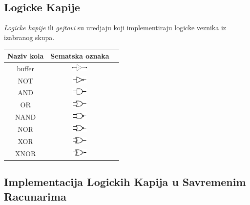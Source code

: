 \documentclass[12p,a4paper]{article}
\begin{document}
\begin{multicols}{2}
    \subsection{Logicke Kapije}

    \emph{Logicke kapije} ili \emph{gejtovi} su uredjaju koji implementiraju 
    logicke veznika iz izabranog skupa.

    \begin{tabular}{*{3}{c}}
        Naziv kola & Sematska oznaka \\
        \midrule
        buffer  & \includegraphics[width=30px]{Figures/buffer.png} \\
        NOT  & \includegraphics[width=30px]{Figures/not.png} \\
        AND  & \includegraphics[width=30px]{Figures/and.png} \\
        OR   & \includegraphics[width=30px]{Figures/or.png} \\
        NAND & \includegraphics[width=30px]{Figures/nand.png} \\
        NOR  & \includegraphics[width=30px]{Figures/nor.png} \\
        XOR  & \includegraphics[width=30px]{Figures/xor.png} \\
        XNOR & \includegraphics[width=30px]{Figures/xnor.png} \\
    \end{tabular}

    \subsection{Implementacija Logickih Kapija u Savremenim Racunarima}


\end{multicols}
\end{document}
